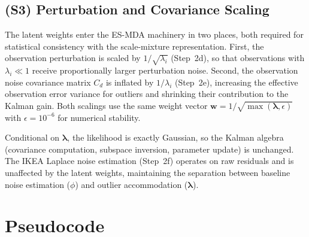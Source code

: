 \documentclass[article,nojss]{jss}
\begin{document}
\subsection*{(S3) Perturbation and Covariance Scaling}

The latent weights enter the ES-MDA machinery in two places, both
required for statistical consistency with the scale-mixture
representation.
First, the observation perturbation is scaled by $1/\sqrt{\lambda_i}$
(Step~2d), so that observations with $\lambda_i \ll 1$ receive
proportionally larger perturbation noise.
Second, the observation noise covariance matrix $C_d$ is inflated by
$1/\lambda_i$ (Step~2e), increasing the effective observation error
variance for outliers and shrinking their contribution to the Kalman
gain.
Both scalings use the same weight vector
$\mathbf{w} = 1/\sqrt{\max(\boldsymbol{\lambda}, \epsilon)}$ with
$\epsilon = 10^{-6}$ for numerical stability.

Conditional on $\boldsymbol{\lambda}$, the likelihood is exactly
Gaussian, so the Kalman algebra (covariance computation, subspace
inversion, parameter update) is unchanged.
The IKEA Laplace noise estimation (Step~2f) operates on raw residuals
and is unaffected by the latent weights, maintaining the separation
between baseline noise estimation ($\phi$) and outlier accommodation
($\boldsymbol{\lambda}$).

\section{Pseudocode}
\end{document}
